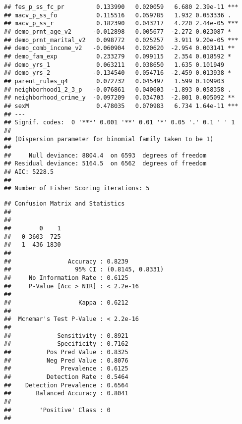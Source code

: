 \documentclass[
]{article}
\newenvironment{Shaded}{\begin{snugshade}}{\end{snugshade}}
\newcommand{\FloatTok}[1]{\textcolor[rgb]{0.00,0.00,0.81}{#1}}
\newcommand{\FunctionTok}[1]{\textcolor[rgb]{0.00,0.00,0.00}{#1}}
\newcommand{\NormalTok}[1]{#1}
\newcommand{\OtherTok}[1]{\textcolor[rgb]{0.56,0.35,0.01}{#1}}
\newcommand{\SpecialCharTok}[1]{\textcolor[rgb]{0.00,0.00,0.00}{#1}}
\begin{document}
\begin{verbatim}
## fes_p_ss_fc_pr         0.133990   0.020059   6.680 2.39e-11 ***
## macv_p_ss_fo           0.115516   0.059785   1.932 0.053336 .  
## macv_p_ss_r            0.182390   0.043217   4.220 2.44e-05 ***
## demo_prnt_age_v2      -0.012898   0.005677  -2.272 0.023087 *  
## demo_prnt_marital_v2   0.098772   0.025257   3.911 9.20e-05 ***
## demo_comb_income_v2   -0.060904   0.020620  -2.954 0.003141 ** 
## demo_fam_exp           0.233279   0.099115   2.354 0.018592 *  
## demo_yrs_1             0.063211   0.038650   1.635 0.101949    
## demo_yrs_2            -0.134540   0.054716  -2.459 0.013938 *  
## parent_rules_q4        0.072732   0.045497   1.599 0.109903    
## neighborhood1_2_3_p   -0.076861   0.040603  -1.893 0.058358 .  
## neighborhood_crime_y  -0.097209   0.034703  -2.801 0.005092 ** 
## sexM                   0.478035   0.070983   6.734 1.64e-11 ***
## ---
## Signif. codes:  0 '***' 0.001 '**' 0.01 '*' 0.05 '.' 0.1 ' ' 1
## 
## (Dispersion parameter for binomial family taken to be 1)
## 
##     Null deviance: 8804.4  on 6593  degrees of freedom
## Residual deviance: 5164.5  on 6562  degrees of freedom
## AIC: 5228.5
## 
## Number of Fisher Scoring iterations: 5
\end{verbatim}

\begin{Shaded}
\end{Shaded}

\begin{verbatim}
## Confusion Matrix and Statistics
## 
##    
##        0    1
##   0 3603  725
##   1  436 1830
##                                           
##                Accuracy : 0.8239          
##                  95% CI : (0.8145, 0.8331)
##     No Information Rate : 0.6125          
##     P-Value [Acc > NIR] : < 2.2e-16       
##                                           
##                   Kappa : 0.6212          
##                                           
##  Mcnemar's Test P-Value : < 2.2e-16       
##                                           
##             Sensitivity : 0.8921          
##             Specificity : 0.7162          
##          Pos Pred Value : 0.8325          
##          Neg Pred Value : 0.8076          
##              Prevalence : 0.6125          
##          Detection Rate : 0.5464          
##    Detection Prevalence : 0.6564          
##       Balanced Accuracy : 0.8041          
##                                           
##        'Positive' Class : 0               
## 
\end{verbatim}
\end{document}
